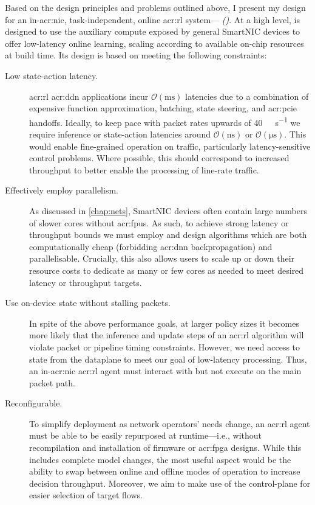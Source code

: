 Based on the design principles and problems outlined above, I present my design for an in-\gls{acr:nic}, task-independent, online \gls{acr:rl} system---\emph{\approachshort{} (\approach)}.
At a high level, \approachshort{} is designed to use the auxiliary compute exposed by general SmartNIC devices to offer low-latency online learning, scaling according to available on-chip resources at build time.
Its design is based on meeting the following constraints:
\begin{description}
	\item[Low state-action latency.] \gls{acr:rl} \gls{acr:ddn} applications incur $\mathcal{O}\left(\unit{\milli\second}\right)$ latencies due to a combination of expensive function approximation, batching, state steering, and \gls{acr:pcie} handoffs. Ideally, to keep pace with packet rates upwards of \qty{40}{\giga\bit\per\second} we require inference or state-action latencies around $\mathcal{O}\left(\unit{\nano\second}\right)$ or $\mathcal{O}\left(\unit{\micro\second}\right)$. This would enable fine-grained operation on traffic, particularly latency-sensitive control problems. Where possible, this should correspond to increased throughput to better enable the processing of line-rate traffic.
	
	\item[Effectively employ parallelism.] As discussed in \cref{chap:nets}, SmartNIC devices often contain large numbers of slower cores without \glspl{acr:fpu}. As such, to achieve strong latency or throughput bounds we must employ and design algorithms which are both computationally cheap (forbidding \gls{acr:dnn} backpropagation) and parallelisable. Crucially, this also allows users to scale up or down their resource costs to dedicate as many or few cores as needed to meet desired latency or throughput targets.
	
	\item[Use on-device state without stalling packets.] In spite of the above performance goals, at larger policy sizes it becomes more likely that the inference and update steps of an \gls{acr:rl} algorithm will violate packet or pipeline timing constraints. However, we need access to state from the dataplane to meet our goal of low-latency processing. Thus, an in-\gls{acr:nic} \gls{acr:rl} agent must interact with but not execute on the main packet path.
	
	\item[Reconfigurable.] To simplify deployment as network operators' needs change, an \approachshort{} \gls{acr:rl} agent must be able to be easily repurposed at runtime---i.e., without recompilation and installation of firmware or \gls{acr:fpga} designs. While this includes complete model changes, the most useful aspect would be the ability to swap between online and offline modes of operation to increase decision throughput. Moreover, we aim to make use of the control-plane for easier selection of target flows.
	

\end{description}
